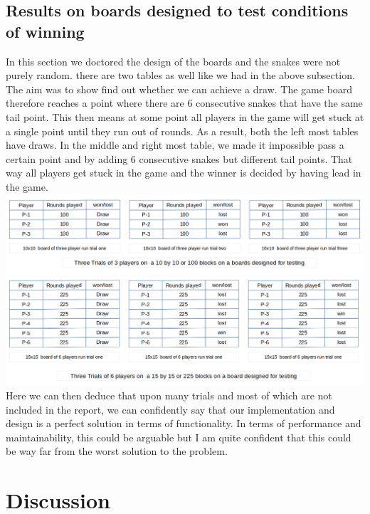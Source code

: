 \subsection*{Results on boards designed to test conditions of winning}
In this section we doctored the design of the boards and the snakes were not purely random. there are two tables as well like we had in the above subsection. The aim was to show find out whether we can achieve a draw. The game board therefore reaches a point where there are 6 consecutive snakes that have the same tail point. This then means at some point all players in the game will get stuck at a single point until they run out of rounds. As a result, both the left most tables have draws. In the middle and right most table, we made it impossible pass a certain point and by adding 6 consecutive snakes but different tail points. That way all players get stuck in the game and the winner is decided by having lead in the game.\\
\includegraphics[scale=0.45]{three.png}\\
\includegraphics[scale=0.45]{six.png}\\ 
Here we can then deduce that upon many trials and most of which are not included in the report, we can confidently say that our implementation and design is a perfect solution in terms of functionality. In terms of performance and maintainability, this could be arguable but I am quite confident that this could be way far from the worst solution to the problem.

\section*{Discussion}
